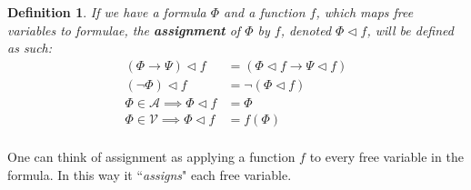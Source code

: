 \documentclass{article}
\newtheorem{defin}{Definition}
\begin{document}
\begin{defin}
If we have a formula $\Phi$ and a function $f$, which maps free variables to formulae,
the \textbf{assignment} of $\Phi$ by $f$, denoted $\Phi \lhd f$, will be defined as such:
\begin{align*}
(\Phi \rightarrow \Psi) \lhd f &= (\Phi \lhd f \rightarrow \Psi \lhd f) \\
(\neg \Phi) \lhd f &= \neg (\Phi \lhd f) \\
\Phi \in \mathcal{A} \implies \Phi \lhd f &= \Phi \\
\Phi \in \mathcal{V} \implies \Phi \lhd f &= f(\Phi) \\
\end{align*}
\end{defin}

One can think of assignment as applying a function $f$ to every free variable in the formula.
In this way it ``\textit{assigns}" each free variable.
\end{document}
